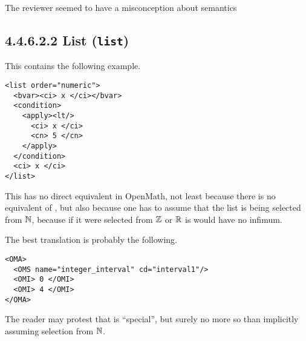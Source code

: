 \documentclass{llncs}
\begin{document}
\begin{newpart}{The reviewer seemed to have a misconception about semantics}
\subsection{4.4.6.2.2 List ({\tt list})}\label{44622}
This contains the following example.
\begin{lstlisting}[language=MathML2]
<list order="numeric">
  <bvar><ci> x </ci></bvar>
  <condition>
    <apply><lt/>
      <ci> x </ci>
      <cn> 5 </cn>
    </apply>
  </condition>
  <ci> x </ci>
</list>
\end{lstlisting}
This has no direct equivalent in OpenMath, not least because there is no
equivalent of {}, but also because one has to assume that
the list is being selected from $\mathbb{N}$, because if it were selected from $\mathbb{Z}$ or
$\mathbb{R}$ is would have no infimum.
\par
The best translation is probably the following.
\begin{lstlisting}
<OMA>
  <OMS name="integer_interval" cd="interval1"/>
  <OMI> 0 </OMI>
  <OMI> 4 </OMI>
</OMA>
\end{lstlisting}
The reader may protest that {} is ``special'', but surely no
more so than implicitly assuming selection from $\mathbb{N}$.


\end{newpart}
\end{document}
